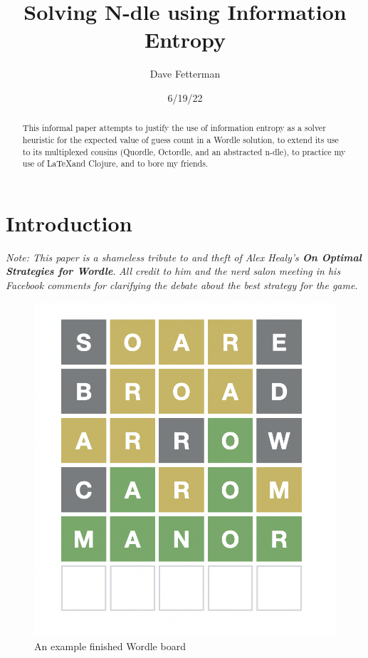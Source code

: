 \documentclass[11pt, oneside]{article} 	%
\title{Solving N-dle using Information Entropy}
\author{Dave Fetterman}
\affil{Obviously Unemployed}
\date{6/19/22}
\begin{document}
\maketitle

\begin{abstract}

This informal paper attempts to justify the use of information entropy as a solver heuristic for the expected value of guess count in a Wordle solution, to extend its use to its multiplexed cousins (Quordle, Octordle, and an abstracted n-dle), to practice my use of \LaTeX and Clojure, and to bore my friends.

\end{abstract}

\section{Introduction}

\emph{Note: This paper is a shameless tribute to and theft of Alex Healy's \textbf{On Optimal Strategies for Wordle}}\cite{1}. \emph{All credit to him and the nerd salon meeting in his Facebook comments for clarifying the debate about the best strategy for the game}.
 
\begin{figure}
\centering
\includegraphics[scale=.3]{wordle}
\caption{An example finished Wordle board}
\end{figure}
\end{document}
